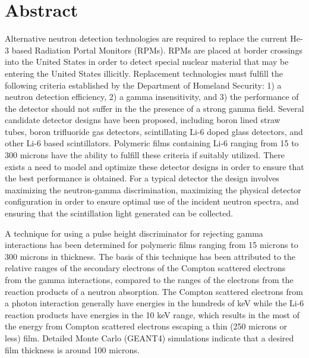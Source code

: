 \chapter*{Abstract}
\label{chap:abstract}
Alternative neutron detection technologies are required to replace the current He-3 based Radiation Portal Monitors (RPMs).
RPMs are placed at border crossings into the United States in order to detect special nuclear material that may be entering the United States illicitly.
Replacement technologies must fulfill the following criteria established by the Department of Homeland Security: 1) a neutron detection efficiency, 2) a gamma insensitivity, and 3) the performance of the detector should not suffer in the the presence of a strong gamma field.
Several candidate detector designs have been proposed, including boron lined straw tubes, boron trifluoride gas detectors, scintillating Li-6 doped glass detectors, and other Li-6 based scintillators.
Polymeric films containing Li-6 ranging from 15 to 300 microns have the ability to fulfill these criteria if suitably utilized.
There exists a need to model and optimize these detector designs in order to ensure that the best performance is obtained. 
For a typical detector the design involves maximizing the neutron-gamma discrimination, maximizing the physical detector configuration in order to ensure optimal use of the incident neutron spectra, and ensuring that the scintillation light generated can be collected.

A technique for using a pulse height discriminator for rejecting gamma interactions has been determined for polymeric films  ranging from 15 microns to 300 microns in thickness.
The basis of this technique has been attributed to the relative ranges of the secondary electrons of the Compton scattered electrons from the gamma interactions, compared to the ranges of the electrons from the reaction products of a neutron absorption.
The Compton scattered electrons from a photon interaction generally have energies in the hundreds of keV while the Li-6 reaction products have energies in the 10 keV range, which results in the most of the energy from Compton scattered electrons escaping a thin (250 microns or less) film.
Detailed Monte Carlo (GEANT4) simulations indicate that a desired film thickness is around 100 microns.

